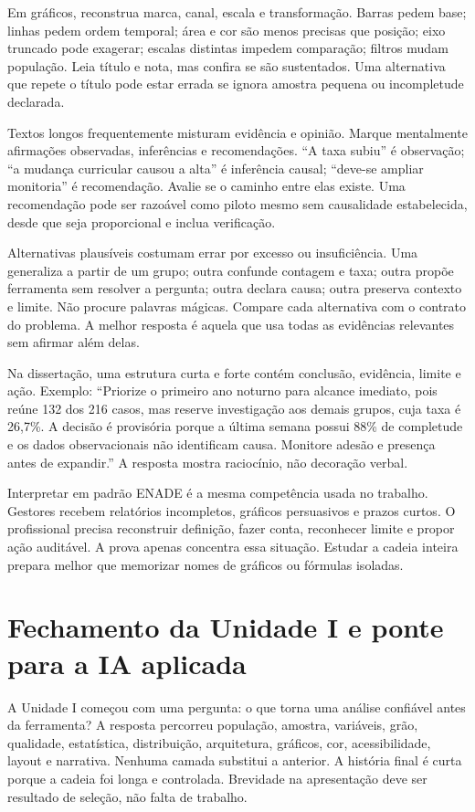 Em gráficos, reconstrua marca, canal, escala e transformação. Barras pedem base; linhas pedem ordem temporal; área e cor são menos precisas que posição; eixo truncado pode exagerar; escalas distintas impedem comparação; filtros mudam população. Leia título e nota, mas confira se são sustentados. Uma alternativa que repete o título pode estar errada se ignora amostra pequena ou incompletude declarada.

Textos longos frequentemente misturam evidência e opinião. Marque mentalmente afirmações observadas, inferências e recomendações. ``A taxa subiu'' é observação; ``a mudança curricular causou a alta'' é inferência causal; ``deve-se ampliar monitoria'' é recomendação. Avalie se o caminho entre elas existe. Uma recomendação pode ser razoável como piloto mesmo sem causalidade estabelecida, desde que seja proporcional e inclua verificação.

Alternativas plausíveis costumam errar por excesso ou insuficiência. Uma generaliza a partir de um grupo; outra confunde contagem e taxa; outra propõe ferramenta sem resolver a pergunta; outra declara causa; outra preserva contexto e limite. Não procure palavras mágicas. Compare cada alternativa com o contrato do problema. A melhor resposta é aquela que usa todas as evidências relevantes sem afirmar além delas.

Na dissertação, uma estrutura curta e forte contém conclusão, evidência, limite e ação. Exemplo: ``Priorize o primeiro ano noturno para alcance imediato, pois reúne 132 dos 216 casos, mas reserve investigação aos demais grupos, cuja taxa é 26,7\%. A decisão é provisória porque a última semana possui 88\% de completude e os dados observacionais não identificam causa. Monitore adesão e presença antes de expandir.'' A resposta mostra raciocínio, não decoração verbal.

Interpretar em padrão ENADE é a mesma competência usada no trabalho. Gestores recebem relatórios incompletos, gráficos persuasivos e prazos curtos. O profissional precisa reconstruir definição, fazer conta, reconhecer limite e propor ação auditável. A prova apenas concentra essa situação. Estudar a cadeia inteira prepara melhor que memorizar nomes de gráficos ou fórmulas isoladas.

\section{Fechamento da Unidade I e ponte para a IA aplicada}

A Unidade I começou com uma pergunta: o que torna uma análise confiável antes da ferramenta? A resposta percorreu população, amostra, variáveis, grão, qualidade, estatística, distribuição, arquitetura, gráficos, cor, acessibilidade, layout e narrativa. Nenhuma camada substitui a anterior. A história final é curta porque a cadeia foi longa e controlada. Brevidade na apresentação deve ser resultado de seleção, não falta de trabalho.

